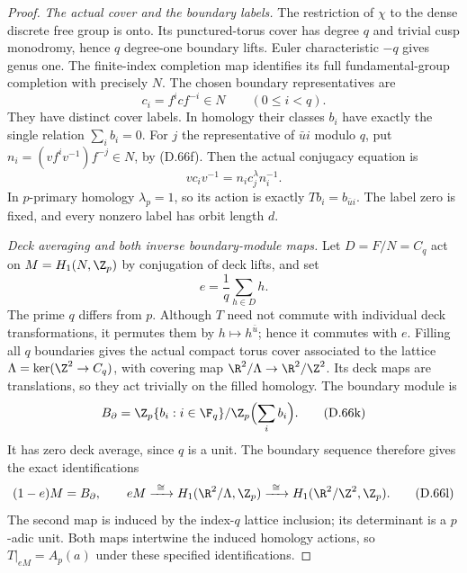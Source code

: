 \begin{proof}
\emph{The actual cover and the boundary labels.}
The restriction of $\chi$ to the dense discrete free group
is onto. Its punctured-torus cover has degree $q$ and
trivial cusp monodromy, hence $q$ degree-one boundary
lifts. Euler characteristic $-q$ gives genus one.
The finite-index completion map identifies its full
fundamental-group completion with precisely $N$.
The chosen boundary representatives are
\[
           c_i=f^i c f^{-i}\in N\qquad(0\leq i<q).
                                                               \tag{D.66h}
\]
They have distinct cover labels. In homology their classes
$b_i$ have exactly the single relation $\sum_i b_i=0$.
For $j$ the representative of $\bar u i$ modulo $q$, put
$n_i=(vf^iv^{-1})f^{-j}\in N$, by (D.66f). Then the
actual conjugacy equation is
\[
                 vc_iv^{-1}=n_i c_j^\lambda n_i^{-1}.     \tag{D.66i}
\]
In $p$-primary homology $\lambda_p=1$, so its action is
exactly $T b_i=b_{\bar u i}$. The label zero is fixed,
and every nonzero label has orbit length $d$.

\emph{Deck averaging and both inverse boundary-module maps.}
Let $D=F/N=C_q$ act on $M=H_1(N,\Z_p)$ by conjugation
of deck lifts, and set
\[
                  e=\frac1q\sum_{h\in D}h.                \tag{D.66j}
\]
The prime $q$ differs from $p$. Although $T$ need not
commute with individual deck transformations, it permutes
them by $h\mapsto h^{\bar u}$; hence it commutes with $e$.
Filling all $q$ boundaries gives the actual compact torus
cover associated to the lattice
$\Lambda=\ker(\Z^2\to C_q)$, with covering map
$\R^2/\Lambda\to\R^2/\Z^2$. Its deck maps are translations,
so they act trivially on the filled homology. The boundary
module is
\[
 B_\partial=\Z_p\{b_i:i\in\F_q\}/\Z_p\Bigl(\sum_i b_i\Bigr).
                                                               \tag{D.66k}
\]
It has zero deck average, since $q$ is a unit. The boundary
sequence therefore gives the exact identifications
\[
 (1-e)M=B_\partial,\qquad
 eM\xrightarrow{\ \cong\ }H_1(\R^2/\Lambda,\Z_p)
       \xrightarrow{\ \cong\ }H_1(\R^2/\Z^2,\Z_p).       \tag{D.66l}
\]
The second map is induced by the index-$q$ lattice inclusion;
its determinant is a $p$-adic unit. Both maps intertwine
the induced homology actions, so $T|_{eM}=A_p(a)$ under
these specified identifications.


\end{proof}
